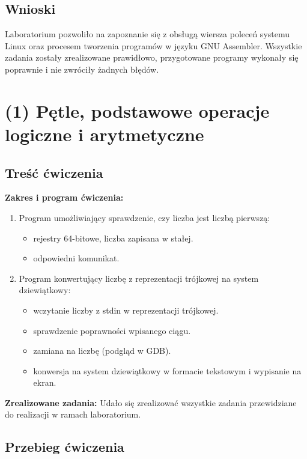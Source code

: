 \documentclass[a4paper,12pt]{article}
\begin{document}
\subsection{Wnioski}
Laboratorium pozwoliło na zapoznanie się z obsługą wiersza poleceń systemu Linux oraz procesem tworzenia programów w języku GNU Assembler. Wszystkie zadania zostały zrealizowane prawidłowo, przygotowane programy wykonały się poprawnie i nie zwróciły żadnych błędów. 
\section{(1) Pętle, podstawowe operacje logiczne i arytmetyczne}
\subsection{Treść ćwiczenia}
\textbf{Zakres i program ćwiczenia:}
\begin{enumerate}
	\item Program umożliwiający sprawdzenie, czy liczba jest liczbą pierwszą:
	\begin{itemize}
		\item  rejestry 64-bitowe, liczba zapisana w stałej.
		\item  odpowiedni komunikat.
	\end{itemize}
	\item  Program konwertujący liczbę z reprezentacji trójkowej na system dziewiątkowy:
	\begin{itemize}
		\item wczytanie liczby z stdin w reprezentacji trójkowej.
		\item sprawdzenie poprawności wpisanego ciągu.
		\item zamiana na liczbę (podgląd w GDB).
		\item konwersja na system dziewiątkowy w formacie tekstowym i wypisanie na ekran.
	\end{itemize}
\end{enumerate}
\textbf{Zrealizowane zadania:}
Udało się zrealizować wszystkie zadania przewidziane do realizacji w ramach laboratorium.
\subsection{Przebieg ćwiczenia}
\end{document}
